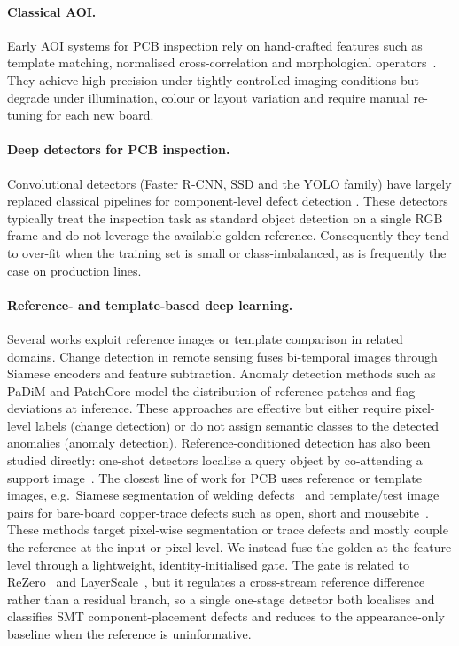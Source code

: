 \documentclass[conference]{IEEEtran}
\begin{document}
\paragraph*{Classical AOI.}
Early AOI systems for PCB inspection rely on hand-crafted features such as
template matching, normalised cross-correlation and morphological
operators~\cite{moganti1996aoi}. They achieve high precision under tightly
controlled imaging conditions but degrade under illumination, colour or layout
variation and require manual re-tuning for each new board.

\paragraph*{Deep detectors for PCB inspection.}
Convolutional detectors (Faster R-CNN, SSD and the YOLO family) have largely
replaced classical pipelines for component-level defect detection
\cite{redmon2016yolo,jocher2023yolov8,xu2025yolo11solder,du2023yolombbi}.
These detectors typically treat the inspection task as standard object detection
on a single RGB frame and do not leverage the available golden reference.
Consequently they tend to over-fit when the training set is small or
class-imbalanced, as is frequently the case on production lines.

\paragraph*{Reference- and template-based deep learning.}
Several works exploit reference images or template comparison in related
domains. Change detection in remote sensing
\cite{daudt2018fcsiamdiff}
fuses bi-temporal images through Siamese encoders and feature subtraction.
Anomaly detection methods such as PaDiM and PatchCore
\cite{defard2021padim,roth2022patchcore}
model the distribution of reference patches and flag deviations at
inference. These approaches are effective but either require pixel-level labels
(change detection) or do not assign semantic classes to the detected anomalies
(anomaly detection). Reference-conditioned detection has also been studied
directly: one-shot detectors localise a query object by co-attending a support
image~\cite{hsieh2019oneshot}. The closest line of work for PCB uses reference or
template images, e.g.\ Siamese segmentation of welding
defects~\cite{ling2022siamesepcb} and template/test image pairs for bare-board
copper-trace defects such as open, short and
mousebite~\cite{tang2019deeppcb,huang2020hripcb}. These methods target pixel-wise
segmentation or trace defects and mostly couple the reference at the input or
pixel level. We instead fuse the golden at the feature level through a
lightweight, identity-initialised gate. The gate is related to
ReZero~\cite{bachlechner2021rezero} and LayerScale~\cite{touvron2021cait}, but it
regulates a cross-stream reference difference rather than a residual branch, so a
single one-stage detector both localises and classifies SMT component-placement
defects and reduces to the appearance-only baseline when the reference is
uninformative.
\end{document}

